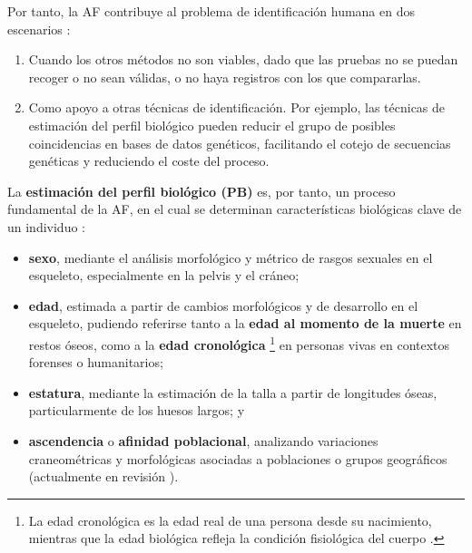 Por tanto, la AF contribuye al problema de identificación humana en dos escenarios \cite{swganth2010}:  

\begin{enumerate}

    \item Cuando los otros métodos no son viables, dado que las pruebas no se puedan recoger o no sean 
    válidas, o no haya registros con los que compararlas.
    
    \item Como apoyo a otras técnicas de identificación. Por ejemplo, las técnicas de estimación del perfil 
    biológico pueden reducir el grupo de posibles coincidencias en bases de datos genéticos, facilitando el 
    cotejo de secuencias genéticas y reduciendo el coste del proceso.  

\end{enumerate}

La \textbf{estimación del perfil biológico (PB)} es, por tanto, un proceso fundamental de la AF, en el cual
se determinan características biológicas clave de un individuo \cite{byers2023}: 

\begin{itemize}

    \item \textbf{sexo}, mediante el análisis morfológico y métrico de rasgos sexuales en el esqueleto, 
    especialmente en la pelvis y el cráneo;
    
    \item \textbf{edad}, estimada a partir de cambios morfológicos y de desarrollo en el esqueleto, pudiendo 
    referirse tanto a la \textbf{edad al momento de la muerte} en restos óseos, como a la \textbf{edad 
    cronológica}
    \footnote{
        La edad cronológica es la edad real de una persona desde su nacimiento, mientras que la edad biológica 
        refleja la condición fisiológica del cuerpo \cite{marcante2025}.
    }
    en personas vivas en contextos forenses o humanitarios;
    
    \item \textbf{estatura}, mediante la estimación de la talla a partir de longitudes óseas, particularmente 
    de los huesos largos; y
    
    \item \textbf{ascendencia} o \textbf{afinidad poblacional}, analizando variaciones craneométricas y 
    morfológicas asociadas a poblaciones o grupos geográficos (actualmente en revisión \cite{ross2021a, 
    ross2021b, flouri2022}).

\end{itemize}

